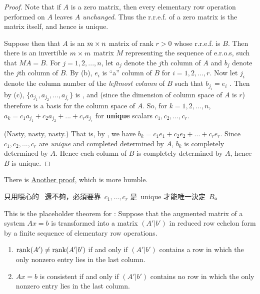 \begin{proof}
Note that if \(A\) is a zero matrix, then every elementary row operation performed on \(A\) leaves \(A\) \emph{unchanged}.
Thus the r.r.e.f. of a zero matrix is the matrix itself, and hence is unique.

Suppose then that \(A\) is an \(m \times n\) matrix of rank \(r > 0\) whose r.r.e.f. is \(B\).
Then there is an invertible \(m \times m\) matrix \(M\) representing the sequence of e.r.o.s, such that \(MA = B\).
For \(j = 1, 2, ..., n\), let \(a_j\) denote the \(j\)th column of \(A\) and \(b_j\) denote the \(j\)th column of \(B\).
By (b), \(e_i\) is ``a'' column of \(B\) for \(i = 1, 2, ..., r\).
Now let \(j_i\) denote the column number of the \emph{leftmost column} of \(B\) such that \(b_{j_i} = e_i\) .
Then by (c), \(\{ a_{j_1}, a_{j_2}, ..., a_{j_r} \}\) is \LID{}, and (since the dimension of column space of \(A\) is \(r\)) therefore is a basis for the column space of \(A\).
So, for \(k = 1, 2, ..., n\), \(a_k = c_1 a_{j_1} + c_2 a_{j_2} + ... + c_r a_{j_r}\) for \textbf{unique} scalars \(c_1, c_2, ..., c_r\).

(Nasty, nasty, nasty.)
That is, by , we have \(b_k = c_1 e_1 + c_2 e_2 + ... + c_r e_r\).
Since \(c_1, c_2, ..., c_r\) are \emph{unique} and completed determined by \(A\), \(b_k\) is completely determined by \(A\).
Hence each column of \(B\) is completely determined by \(A\), hence \(B\) is unique.
\end{proof}

\begin{note}
There is \href{https://www.youtube.com/watch?v=EcgaeUUYV1U&ab_channel=DrPeyam}{Another proof}, which is more humble.
\end{note}

\begin{note}
只用噁心的\  還不夠，必須要靠\ \(c_1, ..., c_r\) 是\ unique 才能唯一決定\ \(B\)。
\end{note}

\begin{additional theorem} \label{athm 3.15}
This is the placeholder theorem for :
Suppose that the augmented matrix of a system \(Ax = b\) is transformed into a matrix \((A'|b')\) in reduced row echelon form by a finite sequence of elementary row operations.
\begin{enumerate}
\item \(\mathrm{rank}(A') \ne \mathrm{rank}(A'|b')\) if and only if \((A'|b')\) contains a row in which the only nonzero entry lies in the last column.
\item \(Ax = b\) is consistent if and only if \((A'|b')\) contains no row in which the only nonzero entry lies in the last column.
\end{enumerate}
\end{additional theorem}

